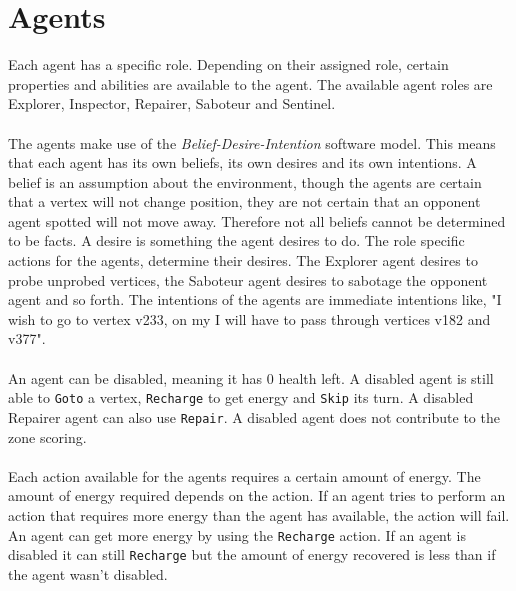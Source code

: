 \documentclass[11pt]{article}
\begin{document}
\section{Agents}
Each agent has a specific role. Depending on their assigned role, certain properties and abilities are available to the agent. The available agent roles are Explorer, Inspector, Repairer, Saboteur and Sentinel.\\
\\
The agents make use of the \emph{Belief-Desire-Intention} software model. This means that each agent has its own beliefs, its own desires and its own intentions. A belief is an assumption about the environment, though the agents are certain that a vertex will not change position, they are not certain that an opponent agent spotted will not move away. Therefore not all beliefs cannot be determined to be facts.
A desire is something the agent desires to do. The role specific actions for the agents, determine their desires. The Explorer agent desires to probe unprobed vertices, the Saboteur agent desires to sabotage the opponent agent and so forth. The intentions of the agents are immediate intentions like, "I wish to go to vertex v233, on my I will have to pass through vertices v182 and v377".\\
\\
An agent can be disabled, meaning it has 0 health left. A disabled agent is still able to {\tt Goto} a vertex, {\tt Recharge} to get energy and {\tt Skip} its turn. A disabled Repairer agent can also use {\tt Repair}. A disabled agent does not contribute to the zone scoring.\\
\\
Each action available for the agents requires a certain amount of energy. The amount of energy required depends on the action. If an agent tries to perform an action that requires more energy than the agent has available, the action will fail. An agent can get more energy by using the {\tt Recharge} action. If an agent is disabled it can still {\tt Recharge} but the amount of energy recovered is less than if the agent wasn't disabled.
\end{document}
